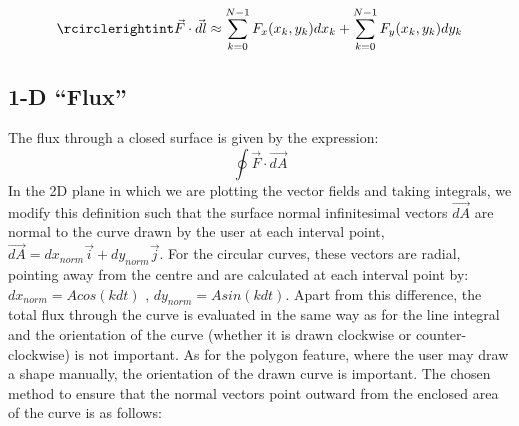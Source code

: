 \documentclass[12pt]{report}
\begin{document}
\begin{equation}
	\rcirclerightint \vec{F} \cdot \vec{dl} \approx \sum_{k=0}^{N-1} F_x(x_k,y_k)dx_k + \sum_{k=0}^{N-1} F_y(x_k,y_k)dy_k
\end{equation}

\subsection{1-D ``Flux''}

The flux through a closed surface is given by the expression:
\begin{equation}
	\oint \vec{F} \cdot \vec{dA}
\end{equation}
In the 2D plane in which we are plotting the vector fields and taking integrals, we modify this definition such that the surface normal infinitesimal vectors $\vec{dA}$ are normal to the curve drawn by the user at each interval point, $\vec{dA} = dx_{norm}\vec{i} + dy_{norm}\vec{j}$. For the circular curves, these vectors are radial, pointing away from the centre and are calculated at each interval point by: $dx_{norm} = Acos(kdt)$ , $dy_{norm} = Asin(kdt)$. Apart from this difference, the total flux through the curve is evaluated in the same way as for the line integral and the orientation of the curve (whether it is drawn clockwise or counter-clockwise) is not important. As for the polygon feature, where the user may draw a shape manually, the orientation of the drawn curve is important. The chosen method to ensure that the normal vectors point outward from the enclosed area of the curve is as follows:
\end{document}
